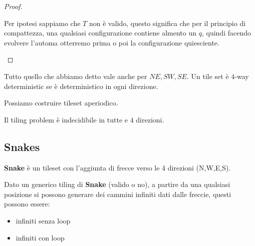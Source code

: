 \begin{teorema} 
\begin{proof}
\begin{itemize}
            Per ipotesi sappiamo che $T$ non è valido, questo significa che 
            per il principio di compattezza, una qualsiasi configurazione contiene 
            almento un $q$, quindi facendo evolvere l'automa otterremo prima o poi 
            la configurazione quiesciente.
        \end{itemize}    
    \end{proof}
\end{teorema}

Tutto quello che abbiamo detto vale anche per $NE, SW, SE$. Un tile set 
è $4$-way deterministic se è deterministico in ogni direzione.

\begin{nota}
    Possiamo costruire tileset aperiodico.
\end{nota}

\begin{teorema}
    Il tiling problem è indecidibile in tutte e $4$ direzioni.
\end{teorema}

\subsection{Snakes}

\begin{definizione} 
    \textbf{Snake} è un tileset con l'aggiunta di frecce verso le 4 direzioni (N,W,E,S).
\end{definizione}

Dato un generico tiling di \textbf{Snake} (valido o no), a partire da una qualsiasi posizione
si possono generare dei cammini infiniti dati dalle freccie, questi possono 
essere:
\begin{itemize}
    \item infiniti senza loop
    \item infiniti con loop
\end{itemize} 

